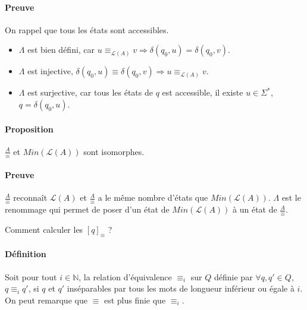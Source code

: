 \paragraph{Preuve} %
\label{par:preuve}

On rappel que tous les états sont accessibles.

\begin{itemize}
	\item $\Lambda$ est bien défini, car $u \equiv_{\mathcal{L}(A)} v \Rightarrow \delta(q_0,u) = \delta(q_0,v)$.
	\item $\Lambda$ est injective, $\delta(q_0,u) \equiv \delta(q_0,v) \Rightarrow u \equiv_{\mathcal{L}(A)} v$.
	\item $\Lambda$ est surjective, car tous les états de $q$ est accessible, il existe $u \in \Sigma^*$, $q=\delta(q_0,u)$.
\end{itemize}



\paragraph{Proposition} %
\label{par:proposition}

$\frac{A}{\equiv}$ et $Min(\mathcal{L}(A))$ sont isomorphes.



\paragraph{Preuve} %
\label{par:preuve}

$\frac{A}{\equiv}$ reconnaît $\mathcal{L}(A)$ et $\frac{A}{\equiv}$ a le même nombre d'états que $Min(\mathcal{L}(A))$. $\Lambda$ est le renommage qui permet de poser d'un état de $Min(\mathcal{L}(A))$ à un état de $\frac{A}{\equiv}$.



Comment calculer les $[q]_{\equiv}$ ?


\paragraph{Définition} %
\label{par:d_finition}

Soit pour tout $i \in \mathbb{N}$, la relation d'équivalence $\equiv_i$ sur $Q$ définie par $\forall q,q' \in Q$, $q \equiv_i q'$, si $q$ et $q'$ inséparables par tous les mots de longueur inférieur ou égale à $i$.
On peut remarque que $\equiv$ est plus finie que $\equiv_i$.

